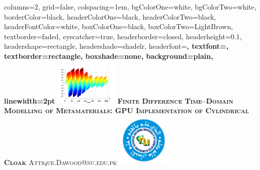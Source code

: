 \documentclass[portrait,final,a1paper,fontscale=0.4]{baposter}
\begin{document}


\begin{poster}%
  {
  columns=2,
  grid=false,
  colspacing=1em,
  bgColorOne=white,
  bgColorTwo=white,
  borderColor=black,
  headerColorOne=black,
  headerColorTwo=black,
  headerFontColor=white,
  boxColorOne=black,
  boxColorTwo=LightBrown,
  textborder=faded,
  eyecatcher=true,
  headerborder=closed,
  headerheight=0.1\textheight,
  headershape=rectangle,
  headershade=shadelr,
  headerfont=\Large\bf\textsc, %
  textfont={\setlength{\parindent}{1.5em}},
  textborder=rectangle,
  boxshade=none,
  background=plain,
  linewidth=2pt
  }
  { 
  \includegraphics[height=6.0em]{Figures/FigCh03_2DDNGSteadyStateLossy}
  } 
  {\bf\textsc{Finite Difference Time--Domain Modelling of Metamaterials: GPU Implementation of Cylindrical Cloak}\vspace{0.4em}}
  {\textsc{Attique.Dawood@nu.edu.pk}\vspace{-0.8em}}
  {%
    \includegraphics[height=7.0em]{Figures/NU_Logo}
    \hspace*{-1.675cm}
  }


\end{poster}
\end{document}
